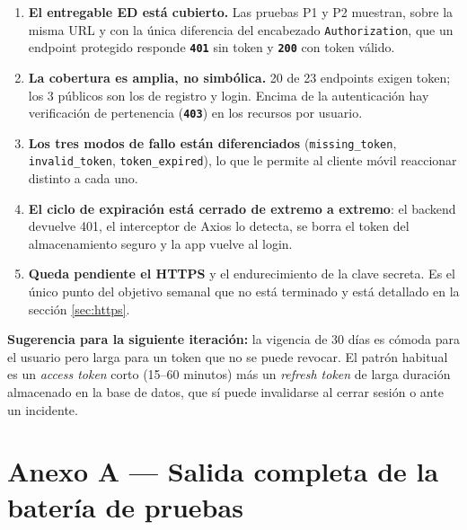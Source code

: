 \documentclass[11pt,letterpaper]{article}
\newcommand{\http}[2]{\textcolor{#1}{\texttt{\textbf{#2}}}}
\begin{document}
\begin{enumerate}[leftmargin=1.4em,itemsep=4pt]
  \item \textbf{El entregable ED está cubierto.} Las pruebas P1 y P2 muestran, sobre la misma
        URL y con la única diferencia del encabezado \texttt{Authorization}, que un endpoint
        protegido responde \http{qcRed}{401} sin token y \http{qcGreen}{200} con token válido.
  \item \textbf{La cobertura es amplia, no simbólica.} 20 de 23 endpoints exigen token; los
        3 públicos son los de registro y login. Encima de la autenticación hay verificación de
        pertenencia (\http{qcRed}{403}) en los recursos por usuario.
  \item \textbf{Los tres modos de fallo están diferenciados}
        (\texttt{missing\_token}, \texttt{invalid\_token}, \texttt{token\_expired}), lo que le
        permite al cliente móvil reaccionar distinto a cada uno.
  \item \textbf{El ciclo de expiración está cerrado de extremo a extremo}: el backend devuelve
        401, el interceptor de Axios lo detecta, se borra el token del almacenamiento seguro y
        la app vuelve al login.
  \item \textbf{Queda pendiente el HTTPS} y el endurecimiento de la clave secreta. Es el único
        punto del objetivo semanal que no está terminado y está detallado en la
        sección \ref{sec:https}.
\end{enumerate}

\vspace{1em}
\begin{nota}
\textbf{Sugerencia para la siguiente iteración:} la vigencia de 30 días es cómoda para el
usuario pero larga para un token que no se puede revocar. El patrón habitual es un
\emph{access token} corto (15--60 minutos) más un \emph{refresh token} de larga duración
almacenado en la base de datos, que sí puede invalidarse al cerrar sesión o ante un incidente.
\end{nota}

\newpage
\section*{Anexo A — Salida completa de la batería de pruebas}
\end{document}
